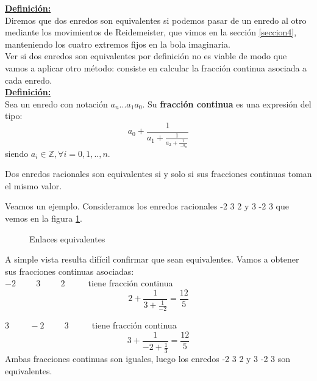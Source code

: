 \underline{\textbf{Definición:}}\\
Diremos que dos enredos son equivalentes si podemos pasar de un enredo al otro mediante los movimientos de Reidemeister, que vimos en la sección \ref{seccion4}, manteniendo los cuatro extremos fijos en la bola imaginaria. \\

Ver si dos enredos son equivalentes por definición no es viable de modo que vamos a aplicar otro método: consiste en calcular la fracción continua asociada a cada enredo.\\

\underline{\textbf{Definición:}}\\
Sea un enredo con notación $a_{n}...a_{1}a_{0}$. Su\textbf{ fracción continua} es una expresión del tipo:
\begin{equation}
    a_{0} + \frac{1}{a_{1} + \frac{1}{a_{2} + \frac{1}{...a_{n}}}}
\end{equation}
siendo $a_{i} \in \mathds{Z},  \forall i = 0,1,..,n.$\\

\begin{teo}
Dos enredos racionales son equivalentes si y solo si sus fracciones continuas toman el mismo valor. 
\end{teo}

Veamos un ejemplo. Consideramos los enredos racionales -2 3 2 y 3 -2 3 que vemos en la figura \ref{conw5}.\\
\begin{figure}[h!]
	\centering
	\space
	\caption{Enlaces equivalentes}
	\label{conw5} 
\end{figure}

A simple vista resulta difícil confirmar que sean equivalentes. Vamos a obtener sus fracciones continuas asociadas:\\
$-2 \hspace{1cm} 3 \hspace{1cm} 2 \hspace{1cm}$ tiene fracción continua
\begin{equation}
 2 + \frac{1}{3 + \frac{1}{-2}} = \frac{12}{5}
\end{equation}

$3 \hspace{1cm} -2 \hspace{1cm} 3 \hspace{1cm}$ tiene fracción continua
\begin{equation}
3 + \frac{1}{-2 + \frac{1}{3}} = \frac{12}{5}
\end{equation}
Ambas fracciones continuas son iguales, luego los enredos -2 3 2 y 3 -2 3 son equivalentes. 

